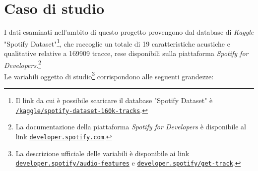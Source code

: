\documentclass[fleqn,10pt]{SelfArx} %
\affiliation{\textsuperscript{1}\textit{794126, Dipartimento di Informatica, Sistemistica e Comunicazione}} %
\begin{document}
\flushbottom %

\maketitle %

\tableofcontents %

\thispagestyle{empty} %


\section{Caso di studio}
I dati esaminati nell'ambito di questo progetto provengono dal database di \textit{Kaggle} "Spotify Dataset"\footnote{Il link da cui è possibile scaricare il database "Spotify Dataset" è \href{https://www.kaggle.com/yamaerenay/spotify-dataset-19212020-160k-tracks}{\texttt{/kaggle/spotify-dataset-160k-tracks}}.}, che raccoglie un totale di 19 caratteristiche acustiche e qualitative relative a 169909 tracce, rese disponibili sulla piattaforma \textit{Spotify for Developers}.\footnote{La documentazione della piattaforma \textit{Spotify for Developers} è disponibile al link \href{https://developer.spotify.com}{\texttt{developer.spotify.com}}.}\\
Le variabili oggetto di studio\footnote{La descrizione ufficiale delle variabili è disponibile ai link \href{https://developer.spotify.com/documentation/web-api/reference/tracks/get-audio-features/}{\texttt{developer.spotify/audio-features}} e \href{https://developer.spotify.com/documentation/web-api/reference/tracks/get-track/}{\texttt{developer.spotify/get-track}}.} corrispondono alle seguenti grandezze:
\end{document}
